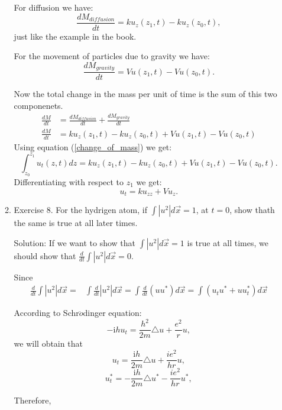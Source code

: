 \documentclass{article}
\begin{document}
\begin{enumerate}
\begin{enumerate}
			For diffusion we have:
			\[\frac{dM_{diffusion}}{dt}=ku_z(z_1,t)-ku_z(z_0,t),\]
			just like the example in the book.

			For the movement of particles due to gravity we have:
			\[\frac{dM_{gravity}}{dt} = Vu(z_1,t) - Vu(z_0,t).\]

			Now the total change in the mass per unit of time is
			the sum of this two componenets.
			\begin{align*}
				\frac{dM}{dt}&=\frac{dM_{diffusion}}{dt}+\frac{dM_{gravity}}{dt} \\
				\frac{dM}{dt}&=ku_z(z_1,t)-ku_z(z_0,t) + Vu(z_1,t) - Vu(z_0,t)
			\end{align*}
			Using equation (\ref{change_of_mass}) we get:
			\[\int_{z_0}^{z_1}u_t(z,t)dz= ku_z(z_1,t)-ku_z(z_0,t) + Vu(z_1,t) - Vu(z_0,t).\]
			Differentiating with respect to $z_1$ we get:
			\[
				u_t=ku_{zz}+Vu_z.
			\]

		\item Exercise 8. For the hydrigen atom, if $ \int \left | u^2 \right | d \vec{x } =1$, at $t=0$, show thath the same is true at all later times.
		
		Solution: If we want to show that $ \int \left | u^2 \right | d \vec{x } =1$ is true at all times, we should show that $\frac{d}{dt}\int \left | u^2 \right | d \vec{x } =0$.
                  
		Since
		\begin{align*}
			 \frac{d}{dt}\int \left | u^2 \right | d \vec{x } =&
			 \int \frac{d}{dt} \left | u^2 \right | d \vec{x }=
			 \int \frac{d}{dt} \left(uu^* \right)d \vec{x }=
			 \int\left(  u_{t}u^*+uu_{t}^*\right) d \vec{x }
		\end{align*}

		According to Schr$\ddot{o}$dinger equation: 
		\[-\mathrm{i}hu_{t}=\frac{h^2}{2m}\triangle u+ \frac{e^2}{r}u,\]
		we will obtain that
		\[u_{t}=\frac{\mathrm{i}h}{2m}\triangle u+ \frac{ie^2}{hr}u,\]
		\[u_{t}^*=-\frac{\mathrm{i}h}{2m}\triangle u^*-\frac{ie^2}{hr}u^*,\]

		Therefore,


\end{enumerate}
\end{enumerate}
\end{document}
